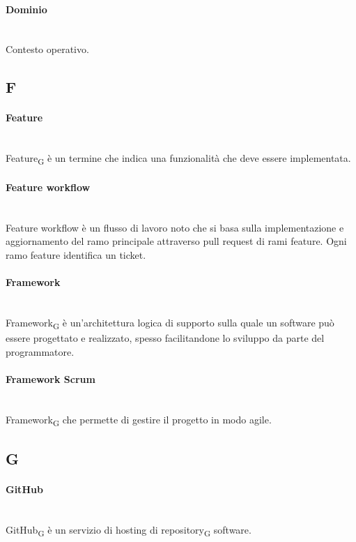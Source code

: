 \paragraph{Dominio}~\smallskip \\
Contesto operativo.

\newpage
{}
\subsection*{F}

\paragraph{Feature}~\smallskip \\
Feature\textsubscript{G} è un termine che indica una funzionalità che deve essere implementata.

\paragraph{Feature workflow}~\smallskip \\
Feature workflow è un flusso di lavoro noto che si basa sulla implementazione e aggiornamento del ramo principale attraverso pull request di rami feature. Ogni ramo feature identifica un ticket.

\paragraph{Framework}~\smallskip \\
Framework\textsubscript{G} è un'architettura logica di supporto sulla quale un software può essere progettato e realizzato, spesso facilitandone lo sviluppo da parte del programmatore.

\paragraph{Framework Scrum}~\smallskip \\
Framework\textsubscript{G} che permette di gestire il progetto in modo agile.

\newpage
{}
\subsection*{G}
\paragraph{GitHub}~\smallskip \\
GitHub\textsubscript{G} è un servizio di hosting di repository\textsubscript{G} software.


